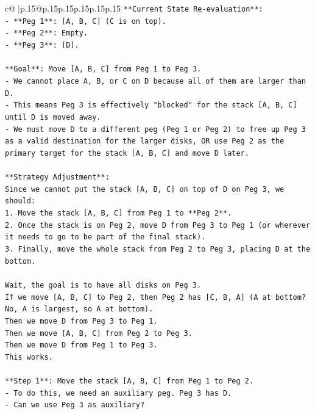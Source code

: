 \documentclass{article}
\begin{document}
{\begin{supertabular}{c@{$\;$}|p{.15\linewidth}@{}p{.15\linewidth}p{.15\linewidth}p{.15\linewidth}p{.15\linewidth}p{.15\linewidth}}
{{{\texttt{**Current State Re{-}evaluation**:} \\
\texttt{{-} **Peg 1**: {[}A, B, C{]} (C is on top).} \\
\texttt{{-} **Peg 2**: Empty.} \\
\texttt{{-} **Peg 3**: {[}D{]}.} \\
\\ 
\texttt{**Goal**: Move {[}A, B, C{]} from Peg 1 to Peg 3.} \\
\texttt{{-} We cannot place A, B, or C on D because all of them are larger than D.} \\
\texttt{{-} This means Peg 3 is effectively "blocked" for the stack {[}A, B, C{]} until D is moved away.} \\
\texttt{{-} We must move D to a different peg (Peg 1 or Peg 2) to free up Peg 3 as a valid destination for the larger disks, OR use Peg 2 as the primary target for the stack {[}A, B, C{]} and move D later.} \\
\\ 
\texttt{**Strategy Adjustment**:} \\
\texttt{Since we cannot put the stack {[}A, B, C{]} on top of D on Peg 3, we should:} \\
\texttt{1. Move the stack {[}A, B, C{]} from Peg 1 to **Peg 2**.} \\
\texttt{2. Once the stack is on Peg 2, move D from Peg 3 to Peg 1 (or wherever it needs to go to be part of the final stack).} \\
\texttt{3. Finally, move the whole stack from Peg 2 to Peg 3, placing D at the bottom.} \\
\\ 
\texttt{Wait, the goal is to have all disks on Peg 3.} \\
\texttt{If we move {[}A, B, C{]} to Peg 2, then Peg 2 has {[}C, B, A{]} (A at bottom? No, A is largest, so A at bottom).} \\
\texttt{Then we move D from Peg 3 to Peg 1.} \\
\texttt{Then we move {[}A, B, C{]} from Peg 2 to Peg 3.} \\
\texttt{Then we move D from Peg 1 to Peg 3.} \\
\texttt{This works.} \\
\\ 
\texttt{**Step 1**: Move the stack {[}A, B, C{]} from Peg 1 to Peg 2.} \\
\texttt{{-} To do this, we need an auxiliary peg. Peg 3 has D.} \\
\texttt{{-} Can we use Peg 3 as auxiliary?} \\
}}}
\end{supertabular}}
\end{document}
